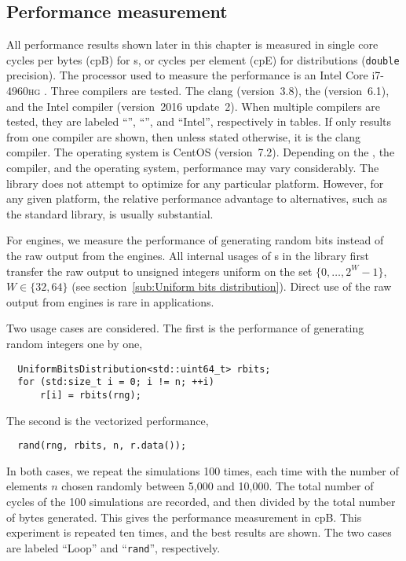 \subsection{Performance measurement}
\label{sub:Performance measurement}

All performance results shown later in this chapter is measured in single core
cycles per bytes (cpB) for \rng{}s, or cycles per element (cpE) for
distributions (\verb|double| precision). The processor used to measure the
performance is an Intel Core i7-4960\textsc{hg} \cpu. Three compilers are
tested. The \llvm clang (version~3.8), the \gnu{} \gcc (version~6.1), and the
Intel \cpp compiler (version~2016 update~2). When multiple compilers are
tested, they are labeled ``\llvm'', ``\gnu'', and ``Intel'', respectively in
tables. If only results from one compiler are shown, then unless stated
otherwise, it is the \llvm clang compiler. The operating system is CentOS
(version~7.2). Depending on the \cpu, the compiler, and the operating system,
performance may vary considerably. The library does not attempt to optimize for
any particular platform. However, for any given platform, the relative
performance advantage to alternatives, such as the standard library, is usually
substantial.

For \rng engines, we measure the performance of generating random bits instead
of the raw output from the engines. All internal usages of \rng{}s in the
library first transfer the raw output to unsigned integers uniform on the set
$\{0,\dots,2^W-1\}$, $W\in\{32,64\}$ (see section~\ref{sub:Uniform bits
  distribution}). Direct use of the raw output from \rng engines is rare in
applications.

Two usage cases are considered. The first is the performance of generating
random integers one by one,
\begin{Verbatim}
  UniformBitsDistribution<std::uint64_t> rbits;
  for (std:size_t i = 0; i != n; ++i)
      r[i] = rbits(rng);
\end{Verbatim}
The second is the vectorized performance,
\begin{Verbatim}
  rand(rng, rbits, n, r.data());
\end{Verbatim}
In both cases, we repeat the simulations 100 times, each time with the number
of elements $n$ chosen randomly between 5,000 and 10,000. The total number of
cycles of the 100 simulations are recorded, and then divided by the total
number of bytes generated. This gives the performance measurement in cpB. This
experiment is repeated ten times, and the best results are shown. The two cases
are labeled ``Loop'' and ``\verb|rand|'', respectively.

